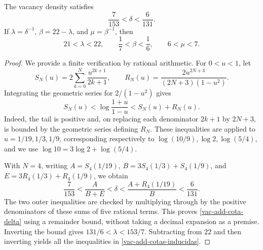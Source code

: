 \begin{lemma}
\label{vac-add-cotas}
The vacancy density satisfies
\begin{equation}
 \frac7{153}<\delta<\frac6{131}.
 \label{vac-add-cota-delta}
\end{equation}
If \(\lambda=\delta^{-1}\), \(\beta=22-\lambda\), and \(\mu=\beta^{-1}\), then
\begin{equation}
 21<\lambda<22,
 \qquad \frac17<\beta<\frac16,
 \qquad 6<\mu<7.
 \label{vac-add-cotas-inducidas}
\end{equation}
\end{lemma}
\begin{proof}
We provide a finite verification by rational arithmetic. For \(0<u<1\), let
\[
 S_N(u)=2\sum_{k=0}^{N}\frac{u^{2k+1}}{2k+1},
 \qquad
 R_N(u)=\frac{2u^{2N+3}}{(2N+3)(1-u^2)}.
\]
Integrating the geometric series for \(2/(1-u^2)\) gives
\[
 S_N(u)<\log\frac{1+u}{1-u}<S_N(u)+R_N(u).
\]
Indeed, the tail is positive and, on replacing each denominator \(2k+1\) by \(2N+3\), is bounded by the geometric series defining \(R_N\). These inequalities are applied to \(u=1/19,1/3,1/9\), corresponding respectively to \(\log(10/9),\log2,\log(5/4)\), and we use \(\log10=3\log2+\log(5/4)\).

With \(N=4\), writing \(A=S_4(1/19)\), \(B=3S_4(1/3)+S_4(1/9)\), and \(E=3R_4(1/3)+R_4(1/9)\), we obtain
\[
 \frac7{153}
 <\frac{A}{B+E}
 <\delta
 <\frac{A+R_4(1/19)}{B}
 <\frac6{131}.
\]
The two outer inequalities are checked by multiplying through by the positive denominators of these sums of five rational terms. This proves \eqref{vac-add-cota-delta} using a remainder bound, without taking a decimal expansion as a premise. Inverting the bound gives \(131/6<\lambda<153/7\). Subtracting from \(22\) and then inverting yields all the inequalities in \eqref{vac-add-cotas-inducidas}.
\end{proof}

